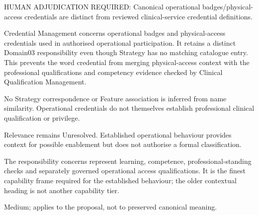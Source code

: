 HUMAN ADJUDICATION REQUIRED: Canonical operational badges/\allowbreak{}physical-access credentials are distinct from reviewed clinical-service credential definitions.



Credential Management concerns operational badges and physical-access credentials used in authorised operational participation. It retains a distinct Domain03 responsibility even though Strategy has no matching catalogue entry. This prevents the word credential from merging physical-access context with the professional qualifications and competency evidence checked by Clinical Qualification Management.



No Strategy correspondence or Feature association is inferred from name similarity. Operational credentials do not themselves establish professional clinical qualification or privilege.



Relevance remains Unresolved. Established operational behaviour provides context for possible enablement but does not authorise a formal classification.



The responsibility concerns represent learning, competence, professional-standing checks and separately governed operational access qualifications. It is the finest capability frame required for the established behaviour; the older contextual heading is not another capability tier.


Medium; applies to the proposal, not to preserved canonical meaning.
